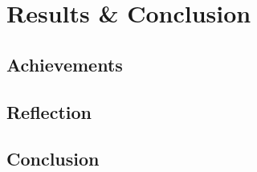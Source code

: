 \chapter{Results \& Conclusion}
\section{Achievements}
\lipsum[2-3]
\section{Reflection}
\lipsum[4-5]
\section{Conclusion}
\lipsum[6-7]
